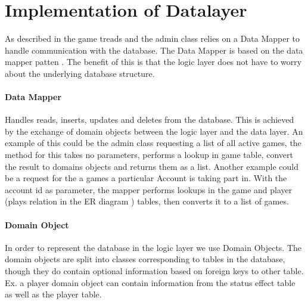 \section{Implementation of Datalayer}
\label{chap:dbImplementation}
As described in  the game treads and the admin class relies on a Data Mapper to handle communication with the database. The Data Mapper is based on the data mapper patten . The benefit of this is that the logic layer does not have to worry about the underlying database structure.
 
\paragraph{Data Mapper}
Handles reads, inserts, updates and deletes from the database. This is achieved by the exchange of domain objects between the logic layer and the data layer.
An example of this could be the admin class requesting a list of all active games, the method for this takes no parameters, performs a lookup in game table, convert the result to domains objects and returns them as a list.
Another example could be a request for the a games a particular Account is taking part in. With the account id as parameter, the mapper performs lookups in the game and player (plays relation in the ER diagram ) tables, then converts it to a list of games.


\paragraph{Domain Object} 
In order to represent the database in the logic layer we use Domain Objects. The domain objects are split into classes corresponding to tables in the database, though they do contain optional information based on foreign keys to other table. Ex. a player domain object can contain information from the status effect table as well as the player table.

